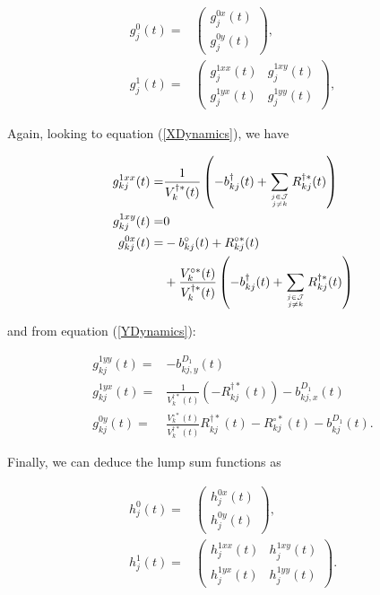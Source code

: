 \documentclass{article}
\newcommand{\1}[1]{\mathbbm{1}_{\left\lbrace #1 \right\rbrace}}
\theoremstyle{break}
\theoremstyle{remark}
\numberwithin{equation}{section}
\begin{document}
\begin{appendices}
\begin{align*}
	g_j^0(t) =&
	\begin{pmatrix}
		g_j^{0x}(t) \\
		g_j^{0y}(t) 
	\end{pmatrix}, \\
	g_j^1(t) =&
	\begin{pmatrix}
		g_j^{1xx}(t) & g_j^{1xy}(t) \\
		g_j^{1yx}(t) & g_j^{1yy}(t)
	\end{pmatrix},
\end{align*}

Again, looking to equation (\ref{XDynamics}), we have

\begin{align*}
	g_{kj}^{1xx}(t) =& \frac{1}{V_k^{\dagger *}(t)} \left(  -b_{kj}^\dagger(t) + \sum_{j \in \mathcal{J} \atop j \neq k} R_{kj}^{\dagger*}(t) \right) \\
	g_{kj}^{1xy}(t) =& 0\\
	g_{kj}^{0x}(t) =&   -b_{kj}^\circ(t) +   R_{kj}^{\circ*}(t) \\
	&+ \frac{V_k^{\circ *}(t)}{V_k^{\dagger *}(t)} \left(  -b_{kj}^\dagger(t) + \sum_{j \in \mathcal{J} \atop j \neq k} R_{kj}^{\dagger*}(t) \right)
\end{align*}

and from equation (\ref{YDynamics}):

\begin{align*}
	g_{kj}^{1yy}(t) =&   -b_{kj,y}^{D_1}(t) \\
	g_{kj}^{1yx}(t) =& \frac{1}{V_k^{\dagger *}(t)} \left( -  R_{kj}^{\dagger*}(t) \right) -   b_{kj,x}^{D_1}(t)\\
	g_{kj}^{0y}(t) =& \frac{V_k^{\circ *}(t)}{V_k^{\dagger *}(t)}  R_{kj}^{\dagger*}(t) - R_{kj}^{\circ*}(t) -b_{kj}^{D_1}(t).
\end{align*}

Finally, we can deduce the lump sum functions as

\begin{align*}
	h_j^0(t) =&
	\begin{pmatrix}
		h_j^{0x}(t) \\
		h_j^{0y}(t) 
	\end{pmatrix}, \\
	h_j^1(t) =&
	\begin{pmatrix}
		h_j^{1xx}(t) & h_j^{1xy}(t) \\
		h_j^{1yx}(t) & h_j^{1yy}(t)
	\end{pmatrix}.
\end{align*}


\end{appendices}
\end{document}
